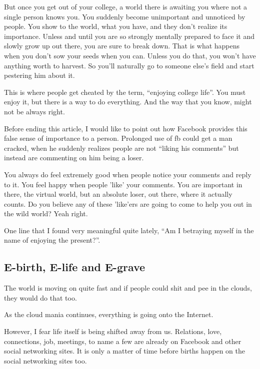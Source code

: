 \documentclass[twoside,11pt]{article}
\begin{document}
But once you get out of your college, a world there is awaiting you where not a single person knows you. You suddenly become unimportant and unnoticed by people. You show to the world, what you have, and they don't realize its importance. Unless and until you are so strongly mentally prepared to face it and slowly grow up out there, you are sure to break down. That is what happens when you don't sow your seeds when you can. Unless you do that, you won't have anything worth to harvest. So you'll naturally go to someone else's field and start pestering him about it.

This is where people get cheated by the term, ``enjoying college life''. You must enjoy it, but there is a way to do everything. And the way that you know, might not be always right.

Before ending this article, I would like to point out how Facebook provides this false sense of importance to a person. Prolonged use of fb could get a man cracked, when he suddenly realizes people are not ``liking his comments'' but instead are commenting on him being a loser.

You always do feel extremely good when people notice your comments and reply to it. You feel happy when people 'like' your comments. You are important in there, the virtual world, but an absolute loser, out there, where it actually counts. Do you believe any of these 'like'ers are going to come to help you out in the wild world? Yeah right.

One line that I found very meaningful quite lately, ``Am I betraying myself in the name of enjoying the present?''.

\newpage
\begin{center}
  \section{E-birth, E-life and E-grave}
\end{center}
\bigskip
\bigskip
\bigskip

The world is moving on quite fast and if people could shit and pee in the clouds, they would do that too.

As the cloud mania continues, everything is going onto the Internet.

However, I fear life itself is being shifted away from us. Relations, love, connections, job, meetings, to name a few are already on Facebook and other social networking sites. It is only a matter of time before births happen on the social networking sites too.
\end{document}
